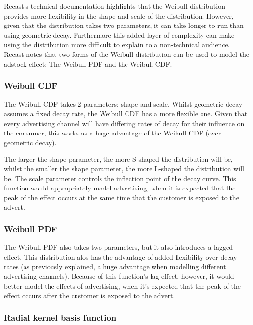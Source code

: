 \documentclass[11pt, a4paper]{article}
\begin{document}
Recast’s technical documentation highlights that the Weibull distribution provides more flexibility in the shape and scale of the distribution. However, given that the distribution takes two parameters, it can take longer to run than using geometric decay. Furthermore this added layer of complexity can make using the distribution more difficult to explain to a non-technical audience. Recast notes that two forms of the Weibull distribution can be used to model the adstock effect: The Weibull PDF and the Weibull CDF. \\

\subsubsection*{Weibull CDF}

The Weibull CDF takes 2 parameters: shape and scale. Whilst geometric decay assumes a fixed decay rate, the Weibull CDF has a more flexible one. Given that every advertising channel will have differing rates of decay for their influence on the consumer, this works as a huge advantage of the Weibull CDF (over geometric decay). 

The larger the shape parameter, the more S-shaped the distribution will be, whilst the smaller the shape parameter, the more L-shaped the distribution will be. The scale parameter controls the inflection point of the decay curve. This function would appropriately model advertising, when it is expected that the peak of the effect occurs at the same time that the customer is exposed to the advert.  

\subsubsection*{Weibull PDF}

The Weibull PDF also takes two parameters, but it also introduces a lagged effect. This distribution alos has the advantage of added flexibility over decay rates (as previously explained, a huge advantage when modelling different advertising channels). Because of this function’s lag effect, however, it would better model the effects of advertising, when it’s expected that the peak of the effect occurs after the customer is exposed to the advert. 

\subsubsection{Radial kernel basis function}
\end{document}
